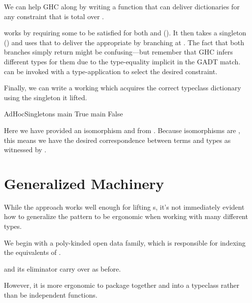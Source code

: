 \documentclass[book.tex]{subfiles}
\begin{document}
We can help GHC along by writing a function that can deliver dictionaries for
any constraint that is total over .


 works by requiring some  to be satisfied for
both  and  (). It then takes a singleton ()
and uses that to deliver the appropriate  by branching at
. The fact that both branches simply return  might be
confusing---but remember that GHC infers different types for them due to the
type-equality implicit in the GADT match.  can be invoked with a
 type-application to select the desired constraint.

Finally, we can write a working  which acquires the correct typeclass
dictionary using the singleton it lifted.


\begin{dorepl}{AdHocSingletons}
main True
main False
\end{dorepl}

Here we have provided an isomorphism  and from . Because isomorphisms are , this
means we have the desired correspondence between terms and types as witnessed by
.


\clearpage
\section{Generalized Machinery}


While the  approach works well enough for lifting s, it's not
immediately evident how to generalize the pattern to be ergonomic when working
with many different types.

We begin with a poly-kinded open data family, which is responsible for indexing
the equivalents of .


 and its eliminator carry over as before.


However, it is more ergonomic to package together  and 
into a typeclass rather than be independent functions.
\end{document}
